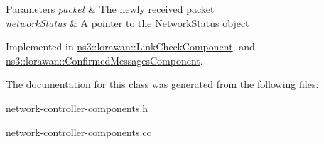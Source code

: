 \begin{DoxyParams}{Parameters}
{\em packet} & The newly received packet \\
\hline
{\em network\+Status} & A pointer to the \hyperlink{classns3_1_1lorawan_1_1NetworkStatus}{Network\+Status} object \\
\hline
\end{DoxyParams}


Implemented in \hyperlink{classns3_1_1lorawan_1_1LinkCheckComponent_a3a17d37153329a0b52b58e8f79675611}{ns3\+::lorawan\+::\+Link\+Check\+Component}, and \hyperlink{classns3_1_1lorawan_1_1ConfirmedMessagesComponent_a0e58f518722ae87373d6a33e7523e8b1}{ns3\+::lorawan\+::\+Confirmed\+Messages\+Component}.



The documentation for this class was generated from the following files\+:\begin{DoxyCompactItemize}
\item 
network-\/controller-\/components.\+h\item 
network-\/controller-\/components.\+cc\end{DoxyCompactItemize}
